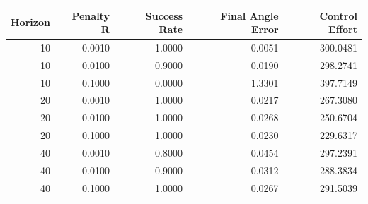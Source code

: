 \begin{tabular}{rrrrr}
\toprule
Horizon & Penalty R & Success Rate & Final Angle Error & Control Effort \\
\midrule
10 & 0.0010 & 1.0000 & 0.0051 & 300.0481 \\
10 & 0.0100 & 0.9000 & 0.0190 & 298.2741 \\
10 & 0.1000 & 0.0000 & 1.3301 & 397.7149 \\
20 & 0.0010 & 1.0000 & 0.0217 & 267.3080 \\
20 & 0.0100 & 1.0000 & 0.0268 & 250.6704 \\
20 & 0.1000 & 1.0000 & 0.0230 & 229.6317 \\
40 & 0.0010 & 0.8000 & 0.0454 & 297.2391 \\
40 & 0.0100 & 0.9000 & 0.0312 & 288.3834 \\
40 & 0.1000 & 1.0000 & 0.0267 & 291.5039 \\
\bottomrule
\end{tabular}
